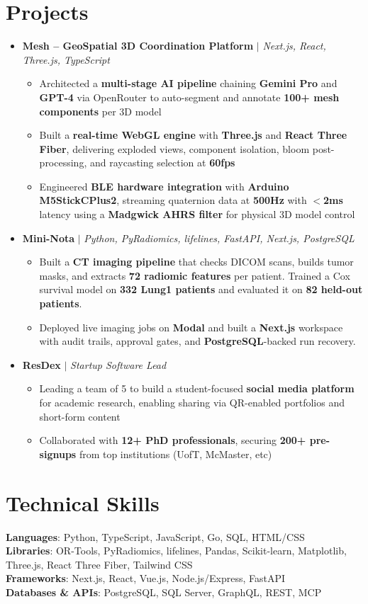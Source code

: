 \documentclass[letterpaper,11pt]{article}
\newcommand{\resumeItem}[1]{\item #1}
\newcommand{\resumeProjectHeading}[2]{
  \item {\fontsize{10.5}{13}\selectfont #1\hfill #2\par}
}
\newcommand{\resumeSubHeadingListStart}{%
  \begin{itemize}[leftmargin=0pt,label={},topsep=0pt,itemsep=7pt,parsep=0pt,partopsep=0pt]}
\newcommand{\resumeSubHeadingListEnd}{\end{itemize}}
\newcommand{\resumeItemListStart}{%
  \begin{itemize}[leftmargin=16pt,topsep=2pt,itemsep=2pt,parsep=0pt,partopsep=0pt]
  \fontsize{10.2}{13.5}\selectfont}
\newcommand{\resumeItemListEnd}{\end{itemize}}
\begin{document}
\section{Projects}
    \resumeSubHeadingListStart
      \resumeProjectHeading
          {\textbf{Mesh -- GeoSpatial 3D Coordination Platform} $|$ \emph{Next.js, React, Three.js, TypeScript}}{}
          \resumeItemListStart
            \resumeItem{Architected a \textbf{multi-stage AI pipeline} chaining \textbf{Gemini Pro} and \textbf{GPT-4} via OpenRouter to auto-segment and annotate \textbf{100+ mesh components} per 3D model}
            \resumeItem{Built a \textbf{real-time WebGL engine} with \textbf{Three.js} and \textbf{React Three Fiber}, delivering exploded views, component isolation, bloom post-processing, and raycasting selection at \textbf{60fps}}
            \resumeItem{Engineered \textbf{BLE hardware integration} with \textbf{Arduino M5StickCPlus2}, streaming quaternion data at \textbf{500Hz} with \textbf{$<$2ms} latency using a \textbf{Madgwick AHRS filter} for physical 3D model control}
          \resumeItemListEnd
            \resumeProjectHeading
          {\textbf{Mini-Nota} $|$ \emph{Python, PyRadiomics, lifelines, FastAPI, Next.js, PostgreSQL}}{}
          \resumeItemListStart
            \resumeItem{Built a \textbf{CT imaging pipeline} that checks DICOM scans, builds tumor masks, and extracts \textbf{72 radiomic features} per patient. Trained a Cox survival model on \textbf{332 Lung1 patients} and evaluated it on \textbf{82 held-out patients}.}
            \resumeItem{Deployed live imaging jobs on \textbf{Modal} and built a \textbf{Next.js} workspace with audit trails, approval gates, and \textbf{PostgreSQL}-backed run recovery.}
          \resumeItemListEnd
            \resumeProjectHeading
          {\textbf{ResDex} $|$ \emph{Startup Software Lead}}{}
          \resumeItemListStart
            \resumeItem{Leading a team of 5 to build a student-focused \textbf{social media platform} for academic research, enabling sharing via QR-enabled portfolios and short-form content}
            \resumeItem{Collaborated with \textbf{12+ PhD professionals}, securing \textbf{200+ pre-signups} from top institutions (UofT, McMaster, etc)}
          \resumeItemListEnd
    \resumeSubHeadingListEnd

\section{Technical Skills}
 {\fontsize{10}{13.2}\selectfont
     \textbf{Languages}{: Python, TypeScript, JavaScript, Go, SQL, HTML/CSS} \\
     \textbf{Libraries}{: OR-Tools, PyRadiomics, lifelines, Pandas, Scikit-learn, Matplotlib, Three.js, React Three Fiber, Tailwind CSS} \\
     \textbf{Frameworks}{: Next.js, React, Vue.js, Node.js/Express, FastAPI} \\
     \textbf{Databases \& APIs}{: PostgreSQL, SQL Server, GraphQL, REST, MCP}
  \par}
\end{document}
